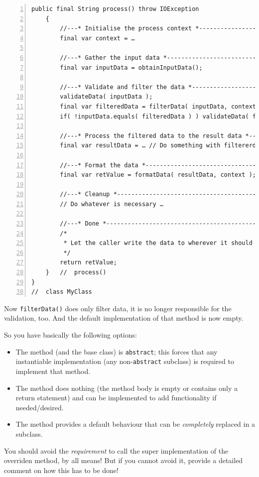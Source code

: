 \documentclass[11pt,a4paper, titlepage, parskip=half, headsepline, footsepline, cleardoublepage=current, headheight=1cm]{scrbook}
\begin{document}
\begin{lstlisting}[numbers=left]
    public final String process() throw IOException
    {
        //---* Initialise the process context *----------------------
        final var context = …
        
        //---* Gather the input data *-------------------------------
        final var inputData = obtainInputData();
        
        //---* Validate and filter the data *------------------------
        validateData( inputData );
        final var filteredData = filterData( inputData, context );
        if( !inputData.equals( filteredData ) ) validateData( filteredData );
        
        //---* Process the filtered data to the result data *--------
        final var resultData = … // Do something with filtererdData
        
        //---* Format the data *-------------------------------------
        final var retValue = formatData( resultData, context );
        
        //---* Cleanup *---------------------------------------------
        // Do whatever is necessary …
        
        //---* Done *------------------------------------------------
        /*
         * Let the caller write the data to wherever it should end up.
         */
        return retValue; 
    }   //  process()
}
//  class MyClass
\end{lstlisting}

Now \lstinline|filterData()| does only filter data, it is no longer responsible for the validation, too. And the default implementation of that method is now empty.

So you have basically the following options:
\begin{itemize}
\item{The method (and the base class) is \lstinline|abstract|; this forces that any instantiable implementation (any non-\lstinline|abstract| subclass) is required to implement that method.}
\item{The method does nothing (the method body is empty or contains only a return statement) and can be implemented to add functionality if needed/desired.}
\item{The method provides a default behaviour that can be \textit{completely} replaced in a subclass.}
\end{itemize}

You should avoid the \textit{requirement} to call the super implementation of the overriden method, by all means! But if you cannot avoid it, provide a detailed comment on how this has to be done!
\end{document}
